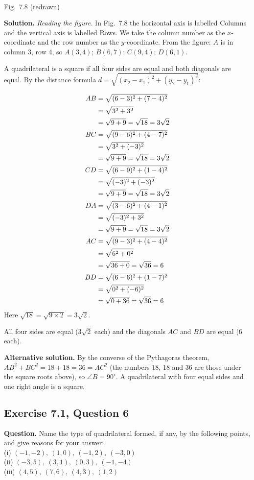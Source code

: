 \begin{center}
\\
{\small Fig.\ 7.8 (redrawn)}
\end{center}

\textbf{Solution.} \emph{Reading the figure.} In Fig.\ 7.8 the horizontal axis is labelled Columns and the vertical axis is labelled Rows. We take the column number as the $x$-coordinate and the row number as the $y$-coordinate. From the figure:
$A$ is in column 3, row 4, so $A(3,4)$; $B(6,7)$; $C(9,4)$; $D(6,1)$.

A quadrilateral is a square if all four sides are equal and both diagonals are equal. By the distance formula $d=\sqrt{(x_2-x_1)^2+(y_2-y_1)^2}$:

\distnote
\begin{align*}
\dist{AB}{3}{4}{6}{7}{3\sqrt2}\\
\dist{BC}{6}{7}{9}{4}{3\sqrt2}\\
\dist{CD}{9}{4}{6}{1}{3\sqrt2}\\
\dist{DA}{6}{1}{3}{4}{3\sqrt2}\\
\dist{AC}{3}{4}{9}{4}{6}\\
\dist{BD}{6}{7}{6}{1}{6}
\end{align*}
Here $\sqrt{18}=\sqrt{9\times2}=3\sqrt2$.

All four sides are equal ($3\sqrt2$ each) and the diagonals $AC$ and $BD$ are equal ($6$ each).

\textbf{Alternative solution.} By the converse of the Pythagoras theorem, $AB^2+BC^2=18+18=36=AC^2$ (the numbers $18$, $18$ and $36$ are those under the square roots above), so $\angle B=90^\circ$. A quadrilateral with four equal sides and one right angle is a square.


\subsection*{Exercise 7.1, Question 6}
\textbf{Question.} Name the type of quadrilateral formed, if any, by the following points, and give reasons for your answer:\\
(i) $(-1,-2),\ (1,0),\ (-1,2),\ (-3,0)$\\
(ii) $(-3,5),\ (3,1),\ (0,3),\ (-1,-4)$\\
(iii) $(4,5),\ (7,6),\ (4,3),\ (1,2)$

